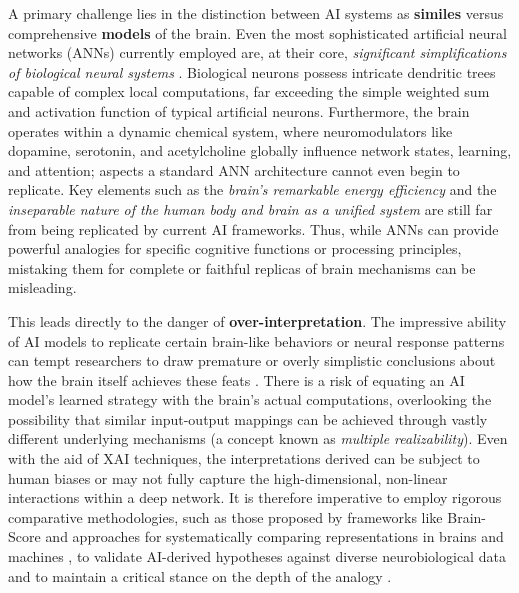 A primary challenge lies in the distinction between AI systems as \textbf{similes} versus comprehensive \textbf{models} of the brain. Even the most sophisticated artificial neural networks (ANNs) currently employed are, at their core, \textit{significant simplifications of biological neural systems} \cite{richards2019deep}. Biological neurons possess intricate dendritic trees capable of complex local computations, far exceeding the simple weighted sum and activation function of typical artificial neurons. Furthermore, the brain operates within a dynamic chemical system, where neuromodulators like dopamine, serotonin, and acetylcholine globally influence network states, learning, and attention; aspects a standard ANN architecture cannot even begin to replicate. Key elements such as the \textit{brain's remarkable energy efficiency} and the \textit{inseparable nature of the human body and brain as a unified system} are still far from being replicated by current AI frameworks. Thus, while ANNs can provide powerful analogies for specific cognitive functions or processing principles, mistaking them for complete or faithful replicas of brain mechanisms can be misleading.

This leads directly to the danger of \textbf{over-interpretation}. The impressive ability of AI models to replicate certain brain-like behaviors or neural response patterns can tempt researchers to draw premature or overly simplistic conclusions about how the brain itself achieves these feats \cite{kriegeskorte2018cognitive}. There is a risk of equating an AI model's learned strategy with the brain's actual computations, overlooking the possibility that similar input-output mappings can be achieved through vastly different underlying mechanisms (a concept known as \textit{multiple realizability}). Even with the aid of XAI techniques, the interpretations derived can be subject to human biases or may not fully capture the high-dimensional, non-linear interactions within a deep network. It is therefore imperative to employ rigorous comparative methodologies, such as those proposed by frameworks like Brain-Score \cite{schrimpf2020brain} and approaches for systematically comparing representations in brains and machines \cite{mcclure2024how}, to validate AI-derived hypotheses against diverse neurobiological data and to maintain a critical stance on the depth of the analogy \cite{doshi2017towards}.

